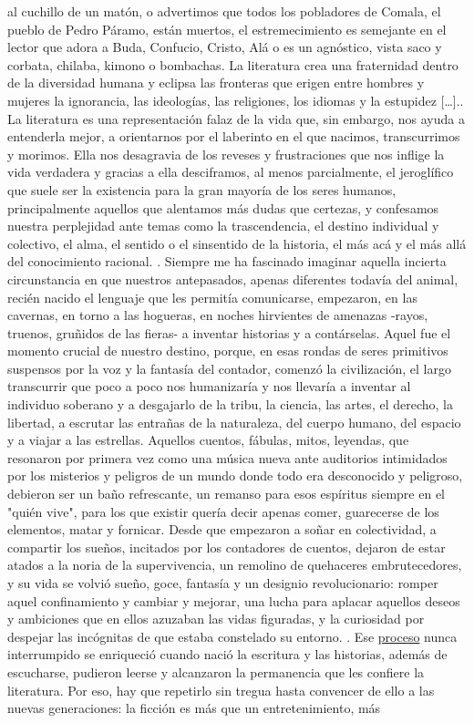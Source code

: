 \documentclass[a4paper,10pt]{article}
\begin{document}
al cuchillo de un matón, o advertimos que todos los pobladores de Comala, el pueblo de Pedro Páramo, están muertos, el estremecimiento es semejante en el lector que adora a Buda, Confucio, Cristo, Alá o es un agnóstico, vista saco y corbata, chilaba, kimono o bombachas. La literatura crea una fraternidad dentro de la diversidad humana y eclipsa las fronteras que erigen entre hombres y mujeres la ignorancia, las ideologías, las religiones, los idiomas y la estupidez […].. La literatura es una representación falaz de la vida que, sin embargo, nos ayuda a entenderla mejor, a orientarnos por el laberinto en el que nacimos, transcurrimos y morimos. Ella nos desagravia de los reveses y frustraciones que nos inflige la vida verdadera y gracias a ella desciframos, al menos parcialmente, el jeroglífico que suele ser la existencia para la gran mayoría de los seres humanos, principalmente aquellos que alentamos más dudas que certezas, y confesamos nuestra perplejidad ante temas como la trascendencia, el destino individual y colectivo, el alma, el sentido o el sinsentido de la historia, el más acá y el más allá del conocimiento racional. . Siempre me ha fascinado imaginar aquella incierta circunstancia en que nuestros antepasados, apenas diferentes todavía del animal, recién nacido el lenguaje que les permitía comunicarse, empezaron, en las cavernas, en torno a las hogueras, en noches hirvientes de amenazas -rayos, truenos, gruñidos de las fieras- a inventar historias y a contárselas. Aquel fue el momento crucial de nuestro destino, porque, en esas rondas de seres primitivos suspensos por la voz y la fantasía del contador, comenzó la civilización, el largo transcurrir que poco a poco nos humanizaría y nos llevaría a inventar al individuo soberano y a desgajarlo de la tribu, la ciencia, las artes, el derecho, la libertad, a escrutar las entrañas de la naturaleza, del cuerpo humano, del espacio y a viajar a las estrellas. Aquellos cuentos, fábulas, mitos, leyendas, que resonaron por primera vez como una música nueva ante auditorios intimidados por los misterios y peligros de un mundo donde todo era desconocido y peligroso, debieron ser un baño refrescante, un remanso para esos espíritus siempre en el "quién vive", para los que existir quería decir apenas comer, guarecerse de los elementos, matar y fornicar. Desde que empezaron a soñar en colectividad, a compartir los sueños, incitados por los contadores de cuentos, dejaron de estar atados a la noria de la supervivencia, un remolino de quehaceres embrutecedores, y su vida se volvió sueño, goce, fantasía y un designio revolucionario: romper aquel confinamiento y cambiar y mejorar, una lucha para aplacar aquellos deseos y ambiciones que en ellos azuzaban las vidas figuradas, y la curiosidad por despejar las incógnitas de que estaba constelado su entorno. . Ese \underline{ proceso} nunca interrumpido se enriqueció cuando nació la escritura y las historias, además de escucharse, pudieron leerse y alcanzaron la permanencia que les confiere la literatura. Por eso, hay que repetirlo sin tregua hasta convencer de ello a las nuevas generaciones: la ficción es más que un entretenimiento, más 
\end{document}

